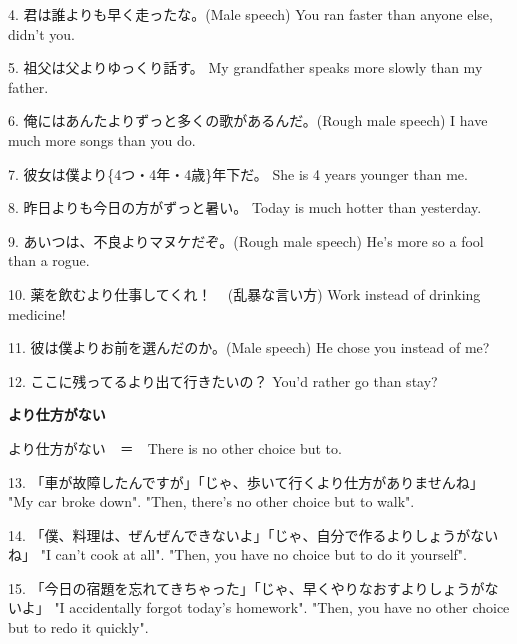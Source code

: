 \par{4. 君は誰よりも早く走ったな。(Male speech) \hfill\break
You ran faster than anyone else, didn't you. }

\par{5. 祖父は父よりゆっくり話す。 \hfill\break
My grandfather speaks more slowly than my father. }

\par{6. 俺にはあんたよりずっと多くの歌があるんだ。(Rough male speech) \hfill\break
I have much more songs than you do. }

\par{7. 彼女は僕より\{4つ・4年・4歳\}年下だ。 \hfill\break
She is 4 years younger than me. }

\par{8. 昨日よりも今日の方がずっと暑い。 \hfill\break
Today is much hotter than yesterday. \hfill\break
}

\par{9. あいつは、不良よりマヌケだぞ。(Rough male speech) \hfill\break
He's more so a fool than a rogue. }

\par{10. 薬を飲むより仕事してくれ！   (乱暴な言い方) \hfill\break
Work instead of drinking medicine! }

\par{11. 彼は僕よりお前を選んだのか。(Male speech) \hfill\break
He chose you instead of me? }

\par{12. ここに残ってるより出て行きたいの？ \hfill\break
You'd rather go than stay? }

\begin{center}
 \textbf{より仕方がない }
\end{center}

\par{ より仕方がない　＝　There is no other choice but to. }

\par{13. 「車が故障したんですが」「じゃ、歩いて行くより仕方がありませんね」 \hfill\break
"My car broke down". "Then, there's no other choice but to walk". }

\par{14. 「僕、料理は、ぜんぜんできないよ」「じゃ、自分で作るよりしょうがないね」 \hfill\break
"I can't cook at all". "Then, you have no choice but to do it yourself". }

\par{15. 「今日の宿題を忘れてきちゃった」「じゃ、早くやりなおすよりしょうがないよ」 \hfill\break
"I accidentally forgot today's homework". "Then, you have no other choice but to redo it quickly". }


